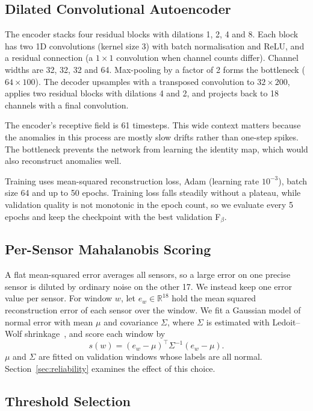 \documentclass[runningheads]{llncs}
\begin{document}
\subsection{Dilated Convolutional Autoencoder}

The encoder stacks four residual blocks with dilations 1, 2, 4 and 8. Each block has two 1D convolutions (kernel size 3) with batch normalisation and ReLU, and a residual connection (a $1\times1$ convolution when channel counts differ). Channel widths are 32, 32, 32 and 64. Max-pooling by a factor of 2 forms the bottleneck ($64 \times 100$). The decoder upsamples with a transposed convolution to $32 \times 200$, applies two residual blocks with dilations 4 and 2, and projects back to 18 channels with a final convolution.

The encoder's receptive field is 61 timesteps. This wide context matters because the anomalies in this process are mostly slow drifts rather than one-step spikes. The bottleneck prevents the network from learning the identity map, which would also reconstruct anomalies well.

Training uses mean-squared reconstruction loss, Adam (learning rate $10^{-3}$), batch size 64 and up to 50 epochs. Training loss falls steadily without a plateau, while validation quality is not monotonic in the epoch count, so we evaluate every 5 epochs and keep the checkpoint with the best validation F$_\beta$.

\subsection{Per-Sensor Mahalanobis Scoring}

A flat mean-squared error averages all sensors, so a large error on one precise sensor is diluted by ordinary noise on the other 17. We instead keep one error value per sensor. For window $w$, let $e_w \in \mathbb{R}^{18}$ hold the mean squared reconstruction error of each sensor over the window. We fit a Gaussian model of normal error with mean $\mu$ and covariance $\Sigma$, where $\Sigma$ is estimated with Ledoit--Wolf shrinkage~\cite{ledoit2004well}, and score each window by
\begin{equation}
  s(w) = (e_w - \mu)^\top \Sigma^{-1} (e_w - \mu).
\end{equation}
$\mu$ and $\Sigma$ are fitted on validation windows whose labels are all normal. Section~\ref{sec:reliability} examines the effect of this choice.

\subsection{Threshold Selection}
\end{document}
